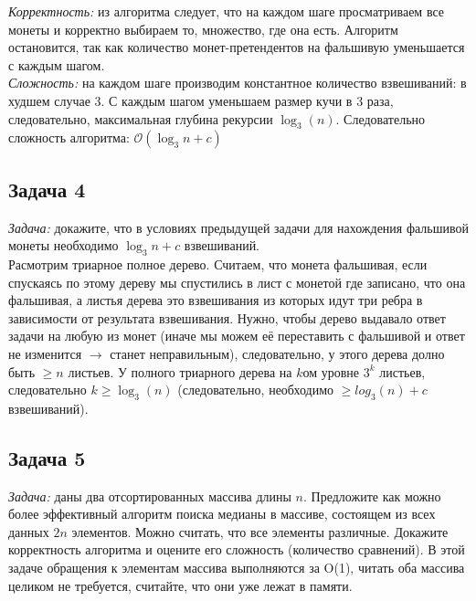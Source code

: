 \documentclass[a4paper,12pt]{article} %
\begin{document}
\textit{Корректность:} из алгоритма следует, что на каждом шаге просматриваем все монеты и корректно выбираем то, множество, где она есть. Алгоритм остановится, так как количество монет-претендентов на фальшивую уменьшается с каждым шагом.\\

\textit{Сложность:} на каждом шаге производим константное количество взвешиваний: в худшем случае 3. С каждым шагом уменьшаем размер кучи в 3 раза, следовательно, максимальная глубина рекурсии $ \log_3(n) $. Следовательно сложность алгоритма: $ \mathcal{O}(\log_3 n+c) $


\subsection*{Задача 4}
\textit{Задача:} докажите, что в условиях предыдущей задачи для нахождения фальшивой
монеты необходимо $\log_3 n + c$ взвешиваний.\\

Расмотрим триарное полное дерево. Считаем, что монета фальшивая, если спускаясь по этому дереву мы спустились в лист с монетой где записано, что она фальшивая, а листья дерева это взвешивания из которых идут три ребра в зависимости от результата взвешивания. Нужно, чтобы дерево выдавало ответ задачи на любую из монет (иначе мы можем её переставить с фальшивой и ответ не изменится $ \longrightarrow $ станет неправильным), следовательно, у этого дерева долно быть $ \geq n $ листьев. У полного триарного дерева на $ k $ом уровне $ 3^k $ листьев, следовательно $ k \geq \log_3(n) $ (следовательно, необходимо $ \geq log_3(n) + c $ взвешиваний).


\subsection*{Задача 5}
\textit{Задача:} даны два отсортированных массива длины $n$. Предложите как можно более эффективный алгоритм поиска медианы в массиве, состоящем из всех данных $2n$ элементов. Можно считать, что все элементы различные. Докажите корректность алгоритма и оцените его сложность (количество сравнений). В этой задаче обращения к элементам массива выполняются за O(1), читать оба массива целиком не требуется, считайте, что они уже лежат в памяти.\\
\end{document}
